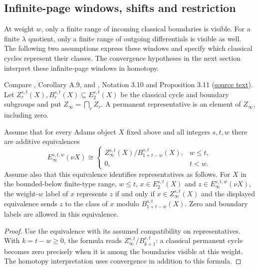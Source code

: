 \subsection{Infinite-page windows, shifts and restriction}
At weight $w$, only a finite range of incoming classical boundaries is
visible. For a finite $\lambda$ quotient, only a finite range of outgoing
differentials is visible as well. The following two assumptions express
these windows and specify which classical cycles represent their
classes. The convergence hypotheses in the next section interpret these
infinite-page windows in homotopy.

\begin{proposition}
\label{sem:Literature:infinite-nu-window}
\label{paper:3.11}
\label{prop:30e8b746}
Compare \cite{BHS}, Corollary A.9, and \cite{LWX126}, Notation 3.10
and Proposition 3.11 (\href{paper/main.tex.html#L841}{source text}).
Let $Z_r^{s,t}(X),B_r^{s,t}(X)\subseteq E_2^{s,t}(X)$ be the classical
cycle and boundary subgroups and put $Z_\infty=\bigcap_rZ_r$.
A permanent representative is an element of $Z_\infty$, including zero.

Assume that for every Adams object $X$ fixed above and all integers
$s,t,w$ there are additive equivalences
\[
 E_\infty^{s,t,w}(\nu X)\cong
 \begin{cases}
 Z_\infty^{s,t}(X)/B_{1+t-w}^{s,t}(X),&w\le t,\\
 0,&t<w.
 \end{cases}
\]
Assume also that this equivalence identifies representatives as follows.
For $X$ in the bounded-below finite-type range, $w\le t$,
$x\in E_2^{s,t}(X)$ and
$z\in E_\infty^{s,t,w}(\nu X)$, the weight-$w$ label of $x$ represents
$z$ if and only if $x\in Z_\infty^{s,t}(X)$ and the displayed equivalence
sends $z$ to the class of $x$ modulo $B_{1+t-w}^{s,t}(X)$.
Zero and boundary labels are allowed in this equivalence.

\end{proposition}
\begin{proof}
Use the equivalence with its assumed compatibility on representatives.
With $k=t-w\ge0$, the formula reads
$Z_\infty^{s,t}/B_{k+1}^{s,t}$: a classical permanent cycle becomes
zero precisely when it is among the boundaries visible at this weight.
The homotopy interpretation uses convergence in addition to this formula.
\end{proof}

